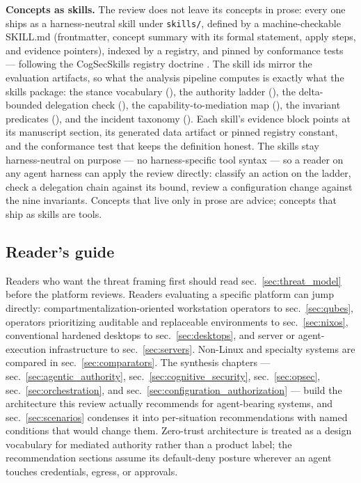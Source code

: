 \documentclass[
  english,
  9pt,
]{extarticle}
\begin{document}
\textbf{Concepts as skills.} The review does not leave its concepts in
prose: every one ships as a harness-neutral skill under
\texttt{skills/}, defined by a machine-checkable SKILL.md (frontmatter,
concept summary with its formal statement, apply steps, and evidence
pointers), indexed by a registry, and pinned by conformance tests ---
following the CogSecSkills registry doctrine \citep{cogsecskills2026}.
The skill ids mirror the evaluation artifacts, so what the analysis
pipeline computes is exactly what the skills package: the stance
vocabulary (), the authority ladder
(), the delta-bounded delegation check
(), the capability-to-mediation map
(), the invariant predicates
(), and the incident taxonomy
(). Each skill's evidence block points at its
manuscript section, its generated data artifact or pinned registry
constant, and the conformance test that keeps the definition honest. The
skills stay harness-neutral on purpose --- no harness-specific tool
syntax --- so a reader on any agent harness can apply the review
directly: classify an action on the ladder, check a delegation chain
against its bound, review a configuration change against the nine
invariants. Concepts that live only in prose are advice; concepts that
ship as skills are tools.

\subsection{Reader's guide}\label{readers-guide}

Readers who want the threat framing first should read
sec.~\ref{sec:threat_model} before the platform reviews. Readers
evaluating a specific platform can jump directly:
compartmentalization-oriented workstation operators to
sec.~\ref{sec:qubes}, operators prioritizing auditable and replaceable
environments to sec.~\ref{sec:nixos}, conventional hardened desktops to
sec.~\ref{sec:desktops}, and server or agent-execution infrastructure to
sec.~\ref{sec:servers}. Non-Linux and specialty systems are compared in
sec.~\ref{sec:comparators}. The synthesis chapters ---
sec.~\ref{sec:agentic_authority}, sec.~\ref{sec:cognitive_security},
sec.~\ref{sec:opsec}, sec.~\ref{sec:orchestration}, and
sec.~\ref{sec:configuration_authorization} --- build the architecture
this review actually recommends for agent-bearing systems, and
sec.~\ref{sec:scenarios} condenses it into per-situation recommendations
with named conditions that would change them. Zero-trust architecture
\citep{nist_sp800_207} is treated as a design vocabulary for mediated
authority rather than a product label; the recommendation sections
assume its default-deny posture wherever an agent touches credentials,
egress, or approvals.
\end{document}
